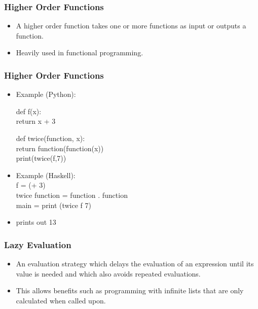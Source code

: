 \documentclass[presentation.tex]{subfiles}
\begin{document}
\begin{frame}
  \frametitle{Higher Order Functions}
     	\begin{itemize}
 	\item A higher order function takes one or more functions as input or outputs a function.
	\item Heavily used in functional programming.
	  	\end{itemize} 
\end{frame}

\begin{frame}
  \frametitle{Higher Order Functions}
	 \begin{itemize}
	 \item Example (Python): \\ \;
	
	{def f(x): \\
	\addtolength{\leftskip}{7mm} return x + 3\\}

	{def twice(function, x): \\
	\addtolength{\leftskip}{7mm} return function(function(x)) \\}
	print(twice(f,7)) \;
	
	\item Example (Haskell): \\ \;
	f = (+ 3) \\
	twice function = function . function \\
	main = print (twice f 7)
	\item prints out 13
	  \end{itemize} 
\end{frame}



\begin{frame}
  \frametitle{Lazy Evaluation}
  	\begin{itemize}
\item   An evaluation strategy which delays the evaluation of an expression until its value is needed and which also avoids repeated evaluations. \\
 \item This allows benefits such as programming with infinite lists that are only calculated when called upon.
   \end{itemize}

\end{frame}
\end{document}
